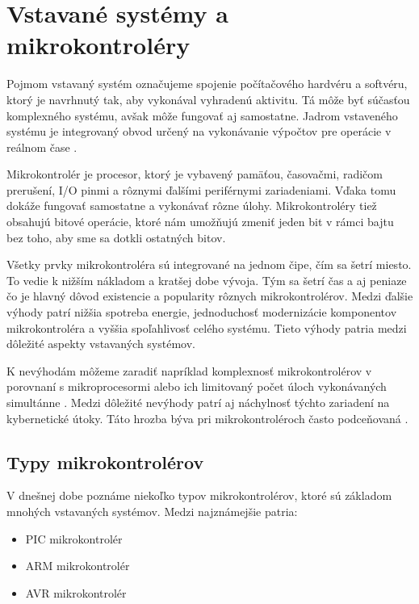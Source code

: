 \section{Vstavané systémy a mikrokontroléry}
\noindent \par
Pojmom vstavaný systém označujeme spojenie počítačového hardvéru a softvéru, ktorý je navrhnutý tak, aby vykonával vyhradenú aktivitu. Tá môže byť súčasťou komplexného systému, avšak môže fungovať aj samostatne. Jadrom vstaveného systému
je integrovaný obvod určený na vykonávanie výpočtov pre operácie v reálnom čase \cite{WhatEmbeddedSystem}. \par
Mikrokontrolér je procesor, ktorý je vybavený pamäťou, časovačmi, radičom prerušení, \acrshort{I/O} pinmi a rôznymi ďalšími periférnymi
zariadeniami. Vďaka tomu dokáže fungovať samostatne a vykonávať rôzne úlohy. Mikrokontroléry tiež obsahujú bitové operácie, ktoré nám umožňujú zmeniť jeden bit v rámci bajtu bez toho, aby sme sa dotkli ostatných bitov. \par
Všetky prvky mikrokontroléra sú integrované na jednom čipe, čím sa šetrí miesto.
To vedie k nižším nákladom a kratšej dobe vývoja. Tým sa šetrí čas a aj peniaze čo je hlavný
dôvod existencie a popularity rôznych mikrokontrolérov. Medzi ďalšie výhody patrí nižšia spotreba energie,
jednoduchosť modernizácie komponentov mikrokontroléra a vyššia spoľahlivosť
celého systému. Tieto výhody patria medzi dôležité aspekty vstavaných systémov. \cite{guntherIntroductionMicrocontrollers2007} \par
K nevýhodám môžeme zaradiť napríklad komplexnosť mikrokontrolérov v porovnaní s mikroprocesormi alebo ich limitovaný počet úloch vykonávaných simultánne \cite{ECSTUFF4UElectronicsEngineer}.
Medzi dôležité nevýhody patrí aj náchylnosť týchto zariadení na kybernetické útoky. Táto hrozba býva pri mikrokontroléroch často podceňovaná \cite{iotSecurityChallenges}.

\subsection{Typy mikrokontrolérov}
\noindent \par
V dnešnej dobe poznáme niekoľko typov mikrokontrolérov, ktoré sú základom mnohých vstavaných systémov. Medzi najznámejšie patria:
\begin{itemize}
    \item \acrshort{PIC} mikrokontrolér
    \item ARM mikrokontrolér
    \item \acrshort{AVR} mikrokontrolér
\end{itemize}

